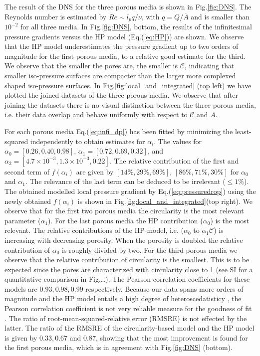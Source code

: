 \documentclass[draft]{agujournal2019}
\begin{document}
The result of the DNS for the three porous media is shown in Fig.\ref{fig:DNS}. The Reynolds number is estimated by $Re \sim l_p q/\nu$, with $q = Q/\overline{A}$ and is smaller than $10^{-2}$ for all three media. In Fig.\ref{fig:DNS}, bottom, the results of the infinitesimal pressure gradients versus the HP model (Eq.(\ref{eq:HP})) are shown. We observe that the HP model underestimates the pressure gradient up to two orders of magnitude for the first porous media, to a relative good estimate for the third. We observe that the smaller the pores are, the smaller is $\mathcal{C}$, indicating that smaller iso-pressure surfaces are compacter than the larger more complexed shaped iso-pressure surfaces. In Fig.\ref{fig:local_and_integrated} (top left) we have plotted the joined datasets of the three porous media. We observe that after joining the datasets there is no visual distinction between the three porous media, i.e. their data overlap and behave uniformly with respect to $\mathcal{C}$ and $A$.
 
For each porous media Eq.(\ref{eq:infi_dp}) has been fitted by minimizing the least-squared independently to obtain estimates for $\alpha_i$. The values for $\alpha_0 =[0.26,0.40,0.98]$, $\alpha_1 = [0.72,0.69,0.32]$, and $\alpha_2 = [4.7\times 10^{-3},1.3 \times 10^{-3},0.22]$. The relative contribution of the first and second term of $f(\alpha_i)$ are given by $[14\%,29\%,69\%]$, $[86\%,71\%,30\%]$ for $\alpha_0$ and $\alpha_1$. The relevance of the last term can be deduced to be irrelevant ($\leq1\%$). The obtained modelled local pressure gradient by Eq.(\ref{eq:pressuredrop}) using the newly obtained $f(\alpha_i)$ is shown in Fig.\ref{fig:local_and_integrated}(top right). We observe that for the first two porous media the circularity is the most relevant parameter ($\alpha_1$). For the last porous media the HP contribution ($\alpha_0$) is the most relevant. The relative contributions of the HP-model, i.e. ($\alpha_0$ to $\alpha_1\mathcal{C}$) is increasing with decreasing porosity. When the porosity is doubled the relative contribution of $\alpha_0$ is roughly divided by two. For the third porous media we observe that the relative contribution of circularity is the smallest. This is to be expected since the pores are characterized with circularity close to 1 (see SI for a quantitative comparison in Fig.\ldots). The Pearson correlation coefficients for these models are $0.93, 0.98, 0.99$ respectively. Because our data spans more orders of magnitude and the HP model entails a high degree of heteroscedatisticy , the Pearson correlation coefficient is not very reliable measure for the goodness of fit . The ratio of root-mean-squared-relative error (RMSRE) is not effected by the latter. The ratio of the RMSRE of the circularity-based model and the HP model is given by $0.33, 0.67$ and $0.87$, showing that the most improvement is found for the first porous media, which is in agreement with Fig.\ref{fig:DNS} (bottom).
\end{document}
